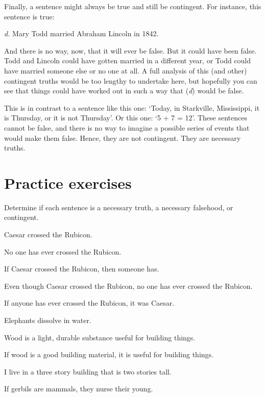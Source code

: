Finally, a sentence might always be true and still be contingent. For instance, this sentence is true: 
	\begin{earg}
		\item[\textit{d.}] Mary Todd married Abraham Lincoln in 1842. 
	\end{earg}
And there is no way, now, that it will ever be false. But it could have been false. Todd and Lincoln could have gotten married in a different  year, or Todd could have married someone else or no one at all. A full analysis of this (and other) contingent truths would be too lengthy to undertake here, but hopefully you can see that things could have worked out in such a way that (\textit{d}) would be false. 

This is in contrast to a sentence like this one: `Today, in Starkville, Mississippi, it is Thursday, or it is not Thursday'. Or this one: `5 + 7 = 12'. These sentences cannot be false, and there is no way to imagine a possible series of events that would make them false. Hence, they are not contingent. They are necessary truths.    



\section{Practice exercises}
\setcounter{ProbPart}{0}

\problempart
\label{pr.EnglishTautology2}
Determine if each sentence is a necessary truth, a necessary falsehood, or contingent.
\begin{earg}
\item Caesar crossed the Rubicon.
\item No one has ever crossed the Rubicon.
\item If Caesar crossed the Rubicon, then someone has.
\item Even though Caesar crossed the Rubicon, no one has ever crossed the Rubicon.
\item If anyone has ever crossed the Rubicon, it was Caesar.

\item Elephants dissolve in water.
\item Wood is a light, durable substance useful for building things.
\item If wood is a good building material, it is useful for building things.
\item I live in a three story building that is two stories tall.
\item If gerbils are mammals, they nurse their young.
\end{earg}

